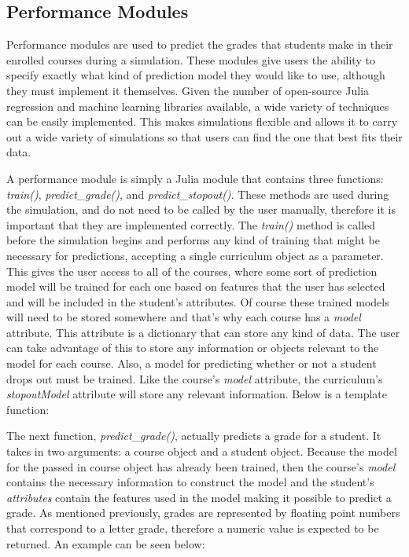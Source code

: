 \documentclass[botnum, fleqn]{unmeethesis}
\begin{document}
    \subsection{Performance Modules}
      Performance modules are used to predict the grades that students make in their enrolled courses during a simulation. These modules give users the ability to specify exactly what kind of prediction model they would like to use, although they must implement it themselves. Given the number of open-source Julia regression and machine learning libraries available, a wide variety of techniques can be easily implemented. This makes simulations flexible and allows it to carry out a wide variety of simulations so that users can find the one that best fits their data. 

      A performance module is simply a Julia module that contains three functions: \textit{train()}, \textit{predict\_grade()}, and \textit{predict\_stopout()}. These methods are used during the simulation, and do not need to be called by the user manually, therefore it is important that they are implemented correctly. The \textit{train()} method is called before the simulation begins and performs any kind of training that might be necessary for predictions, accepting a single curriculum object as a parameter. This gives the user access to all of the courses, where some sort of prediction model will be trained for each one based on features that the user has selected and will be included in the student's attributes. Of course these trained models will need to be stored somewhere and that's why each course has a \textit{model} attribute. This attribute is a dictionary that can store any kind of data. The user can take advantage of this to store any information or objects relevant to the model for each course. Also, a model for predicting whether or not a student drops out must be trained. Like the course's \textit{model} attribute, the curriculum's \textit{stopoutModel} attribute will store any relevant information. Below is a template function:

      

      The next function, \textit{predict\_grade()}, actually predicts a grade for a student. It takes in two arguments: a course object and a student object. Because the model for the passed in course object has already been trained, then the course's \textit{model} contains the necessary information to construct the model and the student's \textit{attributes} contain the features used in the model making it possible to predict a grade. As mentioned previously, grades are represented by floating point numbers that correspond to a letter grade, therefore a numeric value is expected to be returned. An example can be seen below:
\end{document}
